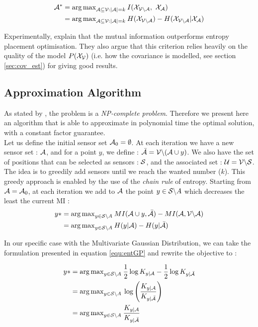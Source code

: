\begin{align}
    \A^* &= {\arg\max}_{\A \subseteq \V : |\A| = k } \: I(\X_{\VA} , \X_\A) \\
    &= {\arg\max}_{\A \subseteq \V : |\A| = k } \: H(\X_{\VA}) -  H(\X_{\VA} | \X_{\A})
\end{align}


Experimentally, \citet{krause_near-optimal_2008} explain that  the mutual information outperforms entropy placement optimisation. They also argue that this criterion relies heavily on the quality of the model $P(\X_\V)$ (i.e. how the covariance is modelled, see section \ref{sec:cov_est}) for giving good results. 

\subsection{Approximation Algorithm}
 
 As stated by \citet{krause_near-optimal_2008}, the problem is a \textit{NP-complete problem}. Therefore we present here an algorithm that is able to approximate in polynomial time the optimal solution, with a constant factor guarantee. \\
 
 Let us define the initial sensor set $\A_0 = \emptyset$. At each iteration we have a new sensor set : $\A$,  and for a point $y$, we define : $\bar{\A} = \V \backslash ( \A \cup y )$. We also have the set of positions that can be selected as sensors : $\S$,  and the associated set : $\U = \V \backslash \S $. \\
 
 
 The idea is to greedily add sensors until we reach the wanted number ($k$).   This greedy approach is enabled by the use of the \textit{chain rule} of entropy.  Starting from $\A = \A_0$, at each iteration we add to $\A$ the point $y \in \S \backslash A $ which decreases the least the current MI : 
\begin{align}
    y* &= {\arg \max}_{y \in \S \backslash A } \: MI(\A \cup y, \bar{\A} ) - MI(\A, \VA) \\
    &= {\arg \max}_{y \in \S \backslash A } \: H(y | \A ) - H(y | \bar{\A} )
\end{align}

In our specific case with the Multivariate Gaussian Distribution, we can take the formulation presented in equation \ref{equ:entGP} and rewrite the objective to : 

\begin{align}
    y*  &= {\arg \max}_{y \in \S \backslash A } \: \frac{1}{2} \log K_{y | \A} - \frac{1}{2} \log K_{y | \bar{\A}} \\
    &= {\arg \max}_{y \in \S \backslash A } \: \log \left(\frac{K_{y | \A}}{K_{y | \bar{\A}}} \right) \\
    &= {\arg \max}_{y \in \S \backslash A } \: \frac{K_{y | \A}}{K_{y | \bar{\A}}}
\end{align}

